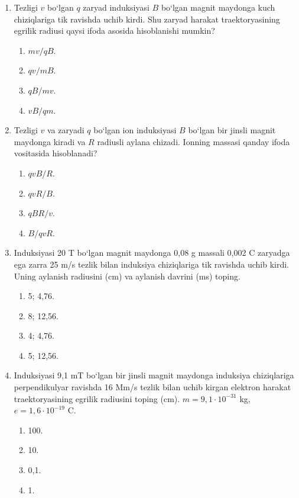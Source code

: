 \begin{enumerate}
\begin{tikzpicture}[>=stealth, scale=1.5]
  
\end{tikzpicture}

\begin{enumerate}[label=\Alph*)]
\item o‘ngga.
\item pastga.
\item yuqoriga.
\item chapga.
\end{enumerate}


\item Tezligi $v$ bo‘lgan $q$ zaryad induksiyasi $B$ bo‘lgan magnit maydonga kuch chiziqlariga tik ravishda uchib kirdi. Shu zaryad harakat traektoryasining egrilik radiusi qaysi ifoda asosida hisoblanishi mumkin?
\begin{enumerate}[label=\Alph*)]
\item $mv/qB$.
\item $qv/mB$.
\item $qB/mv$.
\item $vB/qm$.
\end{enumerate}

\item Tezligi $v$ va zaryadi $q$ bo‘lgan ion induksiyasi $B$ bo‘lgan bir jinsli magnit maydonga kiradi va $R$ radiusli aylana chizadi. Ionning massasi qanday ifoda vositasida hisoblanadi?
\begin{enumerate}[label=\Alph*)]
\item $qvB/R$.
\item $qvR/B$.
\item $qBR/v$.
\item $B/qvR$.
\end{enumerate}

\item Induksiyasi 20 T bo‘lgan magnit maydonga 0,08 g massali 0,002 C zaryadga ega zarra 25 m/s tezlik bilan induksiya chiziqlariga tik ravishda uchib kirdi. Uning aylanish radiusini (cm) va aylanish davrini (ms) toping.
\begin{enumerate}[label=\Alph*)]
\item 5; 4,76.
\item 8; 12,56.
\item 4; 4,76.
\item 5; 12,56.
\end{enumerate}

\item Induksiyasi 9,1 mT bo‘lgan bir jinsli magnit maydonga induksiya chiziqlariga perpendikulyar ravishda 16 Mm/s tezlik bilan uchib kirgan elektron harakat traektoryasining egrilik radiusini toping (cm). $m = 9,1 \cdot 10^{-31}$ kg, $e = 1,6 \cdot 10^{-19}$ C.
\begin{enumerate}[label=\Alph*)]
\item 100.
\item 10.
\item 0,1.
\item 1.
\end{enumerate}


\end{enumerate}

